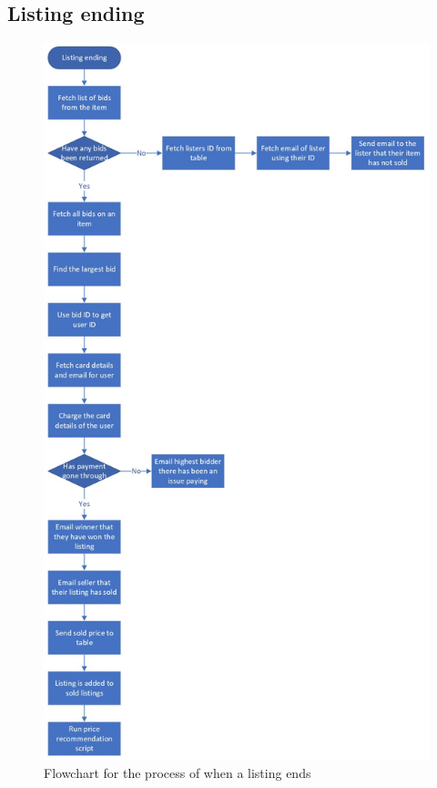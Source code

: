 \subsection{Listing ending}
\begin{figure}[H]
    \centering
    \includegraphics[scale=0.3]{ch2_design/c3_ending.jpeg}
    \caption{Flowchart for the process of when a listing ends}
    \label{fig:flow_ending}
\end{figure}
